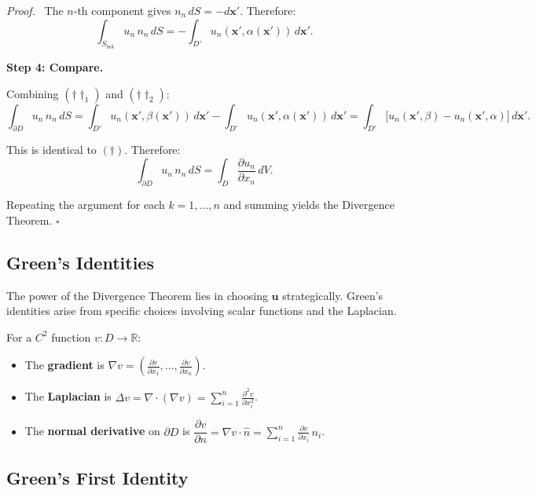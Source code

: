 \documentclass[11pt]{report}
\renewenvironment{proof}[1][Proof]{\par\noindent\textit{#1.}\ }{\hfill$\square$\par\medskip}
\newcommand{\R}{\mathbb{R}}
\newcommand{\parti}[2]{\frac{\partial #1}{\partial #2}}
\begin{document}
\begin{proof}
The $n$-th component gives $n_n \, dS = -d\mathbf{x}'$. Therefore:
\[
\int_{S_{\text{bot}}} u_n \, n_n \, dS = -\int_{D'} u_n(\mathbf{x}', \alpha(\mathbf{x}')) \, d\mathbf{x}'. \tag{$\dagger\dagger_2$}
\]

\textbf{Step 4: Compare.}

Combining $(\dagger\dagger_1)$ and $(\dagger\dagger_2)$:
\[
\int_{\partial D} u_n \, n_n \, dS = \int_{D'} u_n(\mathbf{x}', \beta(\mathbf{x}')) \, d\mathbf{x}' - \int_{D'} u_n(\mathbf{x}', \alpha(\mathbf{x}')) \, d\mathbf{x}' = \int_{D'} \big[ u_n(\mathbf{x}', \beta) - u_n(\mathbf{x}', \alpha) \big] \, d\mathbf{x}'.
\]

This is identical to $(\dagger)$. Therefore:
\[
\int_{\partial D} u_n \, n_n \, dS = \int_D \parti{u_n}{x_n} \, dV.
\]

Repeating the argument for each $k = 1, \ldots, n$ and summing yields the Divergence Theorem.
\end{proof}

\subsection{Green's Identities}

The power of the Divergence Theorem lies in choosing $\mathbf{u}$ strategically. Green's identities arise from specific choices involving scalar functions and the Laplacian.

\begin{definition}
For a $C^2$ function $v: D \to \R$:
\begin{itemize}
    \item The \textbf{gradient} is $\nabla v = \left(\parti{v}{x_1}, \ldots, \parti{v}{x_n}\right)$.
    \item The \textbf{Laplacian} is $\Delta v = \nabla \cdot (\nabla v) = \displaystyle\sum_{i=1}^n \frac{\partial^2 v}{\partial x_i^2}$.
    \item The \textbf{normal derivative} on $\partial D$ is $\dfrac{\partial v}{\partial n} = \nabla v \cdot \hat{n} = \displaystyle\sum_{i=1}^n \parti{v}{x_i} \, n_i$.
\end{itemize}
\end{definition}

\subsection*{Green's First Identity}
\end{document}
